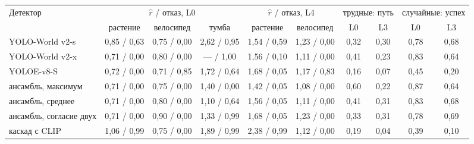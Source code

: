 \begin{tabular}{l|ccc|cc|cc|cc}
\toprule
Детектор & \multicolumn{3}{c|}{$\hat r$ / отказ, L0} & \multicolumn{2}{c|}{$\hat r$ / отказ, L4} & \multicolumn{2}{c|}{трудные: путь} & \multicolumn{2}{c}{случайные: успех} \\
 & растение & велосипед & тумба & растение & велосипед & L0 & L3 & L0 & L3 \\
\midrule
YOLO-World v2-s & 0{,}85 / 0{,}63 & 0{,}75 / 0{,}00 & 2{,}62 / 0{,}95 & 1{,}54 / 0{,}59 & 1{,}23 / 0{,}00 & 0{,}32 & 0{,}30 & 0{,}78 & 0{,}68 \\
YOLO-World v2-x & 0{,}71 / 0{,}00 & 0{,}80 / 0{,}00 & --- / 1{,}00 & 1{,}56 / 0{,}10 & 1{,}11 / 0{,}00 & 0{,}41 & 0{,}23 & 0{,}83 & 0{,}64 \\
YOLOE-v8-S & 0{,}72 / 0{,}00 & 0{,}71 / 0{,}85 & 1{,}72 / 0{,}64 & 1{,}68 / 0{,}05 & 1{,}17 / 0{,}83 & 0{,}16 & 0{,}07 & 0{,}45 & 0{,}20 \\
ансамбль, максимум & 0{,}71 / 0{,}00 & 0{,}75 / 0{,}00 & 1{,}40 / 0{,}00 & 1{,}42 / 0{,}05 & 1{,}08 / 0{,}00 & 0{,}60 & 0{,}22 & 0{,}87 & 0{,}64 \\
ансамбль, среднее & 0{,}71 / 0{,}00 & 0{,}80 / 0{,}00 & 1{,}10 / 0{,}64 & 1{,}56 / 0{,}05 & 1{,}11 / 0{,}00 & 0{,}41 & 0{,}31 & 0{,}83 & 0{,}68 \\
ансамбль, согласие двух & 0{,}71 / 0{,}00 & 0{,}90 / 0{,}00 & 1{,}33 / 0{,}99 & 1{,}68 / 0{,}05 & 1{,}23 / 0{,}00 & 0{,}33 & 0{,}31 & 0{,}78 & 0{,}69 \\
каскад с CLIP & 1{,}06 / 0{,}99 & 0{,}75 / 0{,}00 & 1{,}89 / 0{,}99 & 2{,}38 / 0{,}99 & 1{,}12 / 0{,}00 & 0{,}19 & 0{,}04 & 0{,}39 & 0{,}10 \\
\bottomrule
\end{tabular}
